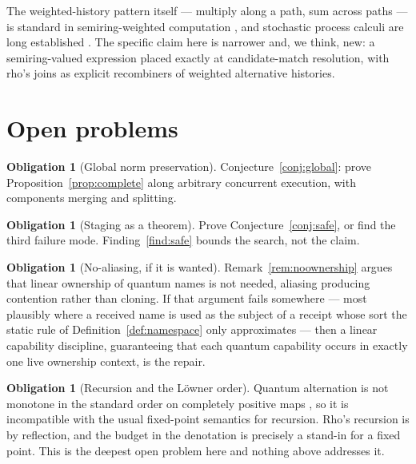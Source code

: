 \documentclass[11pt,a4paper]{article}
\theoremstyle{plain}
\theoremstyle{definition}
\newtheorem{obligation}[theorem]{Obligation}
\theoremstyle{remark}
\begin{document}
The weighted-history pattern itself --- multiply along a path, sum across paths
--- is standard in semiring-weighted computation \cite{DrosteKuichVogler}, and
stochastic process calculi are long established \cite{Priami,SPiM}. The specific
claim here is narrower and, we think, new: a semiring-valued expression placed
exactly at candidate-match resolution, with rho's joins as explicit recombiners
of weighted alternative histories.

\section{Open problems}\label{sec:open}

\begin{obligation}[Global norm preservation]\label{ob:global}
Conjecture~\ref{conj:global}: prove Proposition~\ref{prop:complete} along
arbitrary concurrent execution, with components merging and splitting.
\end{obligation}

\begin{obligation}[Staging as a theorem]\label{ob:staging}
Prove Conjecture~\ref{conj:safe}, or find the third failure mode.
Finding~\ref{find:safe} bounds the search, not the claim.
\end{obligation}

\begin{obligation}[No-aliasing, if it is wanted]\label{ob:aliasing}
Remark~\ref{rem:noownership} argues that linear ownership of quantum names is
not needed, aliasing producing contention rather than cloning. If that argument
fails somewhere --- most plausibly where a received name is used as the subject
of a receipt whose sort the static rule of Definition~\ref{def:namespace} only
approximates --- then a linear capability discipline, guaranteeing that each
quantum capability occurs in exactly one live ownership context, is the repair.
\end{obligation}

\begin{obligation}[Recursion and the Löwner order]\label{ob:recursion}
Quantum alternation is not monotone in the standard order on completely positive
maps \cite{BadescuPanangaden}, so it is incompatible with the usual fixed-point
semantics for recursion. Rho's recursion is by reflection, and the budget in the
denotation is precisely a stand-in for a fixed point. This is the deepest open
problem here and nothing above addresses it.
\end{obligation}
\end{document}
